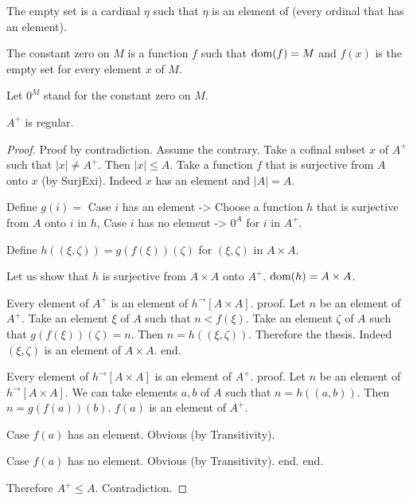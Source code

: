 \documentclass{article}
\newcommand{\Prod}[2]{#1\times #2}
\newcommand{\Succ}[1]{#1^{+}}
\newcommand{\image}[2]{#1^{\to}[#2]}
\newcommand{\card}[1]{\left|#1\right|}
\begin{document}
\begin{forthel}
    \begin{definition}
      The empty set is a cardinal $\eta$ such that $\eta$
      is an element of (every ordinal that has an element).
    \end{definition}

    \begin{definition}
      The constant zero on $M$ is a function $f$ such that $\operatorname{dom}(f) = M$ and $f(x)$ is the empty set for every element $x$ of $M$.
    \end{definition}

    Let $0^M$ stand for the constant zero on $M$.

    \begin{theorem}
      $\Succ{A}$ is regular.
    \end{theorem}
    \begin{proof}
      Proof by contradiction. Assume the contrary. Take a cofinal subset $x$ of
      $\Succ{A}$ such that $\card{x} \neq \Succ{A}$. Then $\card{x} \leq A$. Take a function $f$ that is surjective from $A$ onto $x$ (by SurjExi). Indeed $x$ has an element and $\card{A} = A$.

      Define $g(i) =$
        Case $i$ has an element -> Choose a function $h$ that is surjective from $A$ onto $i$ in $h$,
        Case $i$ has no element -> $0^A$
      for $i$ in $\Succ{A}$.

      Define $h((\xi,\zeta)) = g(f(\xi))(\zeta)$ for $(\xi,\zeta)$ in $\Prod{A}{A}$.

      Let us show that $h$ is surjective from $\Prod{A}{A}$ onto $\Succ{A}$. $\dom(h) = \Prod{A}{A}$.

        Every element of $\Succ{A}$ is an element of $\image{h}{\Prod{A}{A}}$.
        proof.
          Let $n$ be an element of $\Succ{A}$.
          Take an element $\xi$ of $A$ such that $n < f(\xi)$.
          Take an element $\zeta$ of $A$ such that $g(f(\xi))(\zeta) = n$.
          Then $n = h((\xi,\zeta))$.
          Therefore the thesis.
          Indeed $(\xi,\zeta)$ is an element of $\Prod{A}{A}$.
        end.

        Every element of $\image{h}{\Prod{A}{A}}$ is an element of $\Succ{A}$.
        proof.
          Let $n$ be an element of $\image{h}{\Prod{A}{A}}$.
          We can take elements $a,b$ of $A$ such that $n = h((a,b))$.
          Then $n = g(f(a))(b)$. $f(a)$ is an element of $\Succ{A}$.

          Case $f(a)$ has an element. Obvious (by Transitivity).

          Case $f(a)$ has no element. Obvious (by Transitivity).
        end.
      end.

      Therefore $\Succ{A} \leq A$. Contradiction.
    \end{proof}
  \end{forthel}
\end{document}
